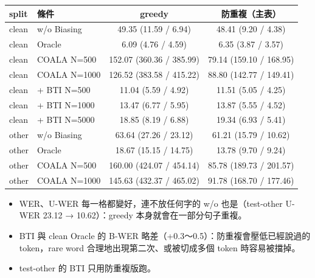 \documentclass[11pt,a4paper]{article}
\begin{document}
\begin{center}
{\small
\begin{tabular}{llcc}
\toprule
\textbf{split} & \textbf{條件} & \textbf{greedy} & \textbf{防重複（主表）} \\
\midrule
clean & w/o Biasing & 49.35 (11.59 / 6.94) & 48.41 (9.20 / 4.38) \\
clean & Oracle & 6.09 (4.76 / 4.59) & 6.35 (3.87 / 3.57) \\
clean & COALA N=500 & 152.07 (360.36 / 385.99) & 79.14 (159.10 / 168.95) \\
clean & COALA N=1000 & 126.52 (383.58 / 415.22) & 88.80 (142.77 / 149.41) \\
clean & + BTI N=500 & 11.04 (5.59 / 4.92) & 11.51 (5.05 / 4.25) \\
clean & + BTI N=1000 & 13.47 (6.77 / 5.95) & 13.87 (5.55 / 4.52) \\
clean & + BTI N=5000 & 18.85 (8.19 / 6.88) & 19.34 (6.93 / 5.41) \\
\midrule
other & w/o Biasing & 63.64 (27.26 / 23.12) & 61.21 (15.79 / 10.62) \\
other & Oracle & 18.67 (15.15 / 14.75) & 13.78 (9.70 / 9.24) \\
other & COALA N=500 & 160.00 (424.07 / 454.14) & 85.78 (189.73 / 201.57) \\
other & COALA N=1000 & 145.63 (432.37 / 465.02) & 91.78 (168.70 / 177.46) \\
\bottomrule
\end{tabular}
}
\end{center}

{\small
\begin{itemize}[leftmargin=1.5em, itemsep=0pt]
  \item WER、U-WER 每一格都變好，連不放任何字的 w/o 也是（test-other U-WER 23.12 → 10.62）：greedy 本身就會在一部分句子重複。
  \item BTI 與 clean Oracle 的 B-WER 略差（+0.3～0.5）：防重複會壓低已經說過的 token，rare word 合理地出現第二次、或被切成多個 token 時容易被擋掉。
  \item test-other 的 BTI 只用防重複版跑。
\end{itemize}
}
\end{document}
